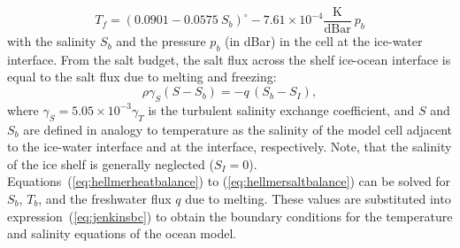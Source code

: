 \begin{equation}
  \label{eq:helmerfreeze}
    T_{f} = (0.0901 - 0.0575\ S_{b})^{\circ}
    - 7.61 \times 10^{-4}\frac{\text{K}}{\text{dBar}}\ p_{b} 
\end{equation}
with the salinity $S_{b}$ and the pressure $p_{b}$ (in dBar) in the
cell at the ice-water interface. From the salt budget, the salt flux
across the shelf ice-ocean interface is equal to the salt flux due to
melting and freezing:
\begin{equation}
  \label{eq:hellmersaltbalance}
  \rho \gamma_{S} (S - S_{b}) = - q\,(S_{b}-S_{I}),
\end{equation}
where $\gamma_S = 5.05\times10^{-3}\gamma_T$ is the turbulent salinity
exchange coefficient, and $S$ and $S_{b}$ are defined in analogy to
temperature as the salinity of the model cell adjacent to the
ice-water interface and at the interface, respectively. Note, that the
salinity of the ice shelf is generally neglected ($S_{I}=0$).
Equations~(\ref{eq:hellmerheatbalance}) to (\ref{eq:hellmersaltbalance}) can
be solved for $S_{b}$, $T_{b}$, and the freshwater flux $q$ due to
melting. These values are substituted into expression~(\ref{eq:jenkinsbc})
to obtain the boundary conditions for the temperature and salinity
equations of the ocean model.

